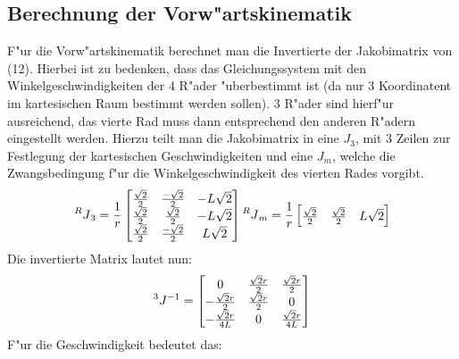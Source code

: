 \documentclass[11pt]{article}
\begin{document}
    \subsection{Berechnung der Vorw"artskinematik}\label{subsec:vor}
    F"ur die Vorw"artskinematik berechnet man die Invertierte der Jakobimatrix von (12).
    Hierbei ist zu bedenken, dass das Gleichungssystem mit den Winkelgeschwindigkeiten der 4 R"ader "uberbestimmt ist (da nur 3 Koordinatent im kartesischen Raum bestimmt werden sollen).
    3 R"ader sind hierf"ur ausreichend, das vierte Rad muss dann entsprechend den anderen R"adern eingestellt werden.
    Hierzu teilt man die Jakobimatrix in eine $J_{3}$, mit 3 Zeilen zur Festlegung der kartesischen Geschwindigkeiten und eine $J_{m}$, welche die Zwangsbedingung f"ur die Winkelgeschwindigkeit des vierten Rades vorgibt.
    \begin{equation}
        \prescript{R}{}{J}_{3} = \frac{1}{r}
        \begin{bmatrix}
            \frac{\sqrt{2}}{2} & \frac{-\sqrt{2}}{2} & -L\sqrt{2} \\
            \frac{\sqrt{2}}{2} & \frac{\sqrt{2}}{2} & -L\sqrt{2} \\
            \frac{\sqrt{2}}{2} & \frac{-\sqrt{2}}{2} & L\sqrt{2} \\
        \end{bmatrix}\label{eq:j3}
        \prescript{R}{}{J}_{m} = \frac{1}{r}
        \begin{bmatrix}
            \frac{\sqrt{2}}{2} & \frac{\sqrt{2}}{2} & L\sqrt{2} \\
        \end{bmatrix}
    \end{equation}
    Die invertierte Matrix lautet nun:
    \begin{equation}
        \prescript{3}{}{J}^{-1} =
        \begin{bmatrix}
            0 & \frac{\sqrt{2}r}{2} & \frac{\sqrt{2}r}{2} \\
            -\frac{\sqrt{2}r}{2} & \frac{\sqrt{2}r}{2} & 0 \\
            -\frac{\sqrt{2}r}{4L} & 0 & \frac{\sqrt{2}r}{4L} \\
        \end{bmatrix}\label{eq:invertedj3}
    \end{equation}
    F"ur die Geschwindigkeit bedeutet das:
\end{document}
